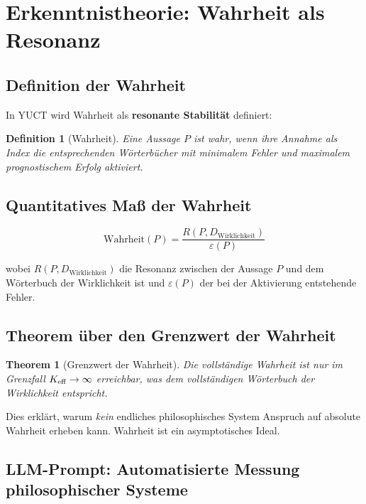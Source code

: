\documentclass[12pt,a4paper]{article}
\newcommand{\eps}{\varepsilon}
\newtheorem{theorem}{Theorem}[section]
\newtheorem{definition}{Definition}[section]
\begin{document}
	\section{Erkenntnistheorie: Wahrheit als Resonanz}
	
	\subsection{Definition der Wahrheit}
	
	In YUCT wird Wahrheit als \textbf{resonante Stabilität} definiert:
	
	\begin{definition}[Wahrheit]
		Eine Aussage \(P\) ist wahr, wenn ihre Annahme als Index die entsprechenden Wörterbücher mit minimalem Fehler und maximalem prognostischem Erfolg aktiviert.
	\end{definition}
	
	\subsection{Quantitatives Maß der Wahrheit}
	
	\begin{equation}
		\text{Wahrheit}(P) = \frac{R(P, D_{\text{Wirklichkeit}})}{\eps(P)}
	\end{equation}
	
	wobei \(R(P, D_{\text{Wirklichkeit}})\) die Resonanz zwischen der Aussage \(P\) und dem Wörterbuch der Wirklichkeit ist und \(\eps(P)\) der bei der Aktivierung entstehende Fehler.
	
	\subsection{Theorem über den Grenzwert der Wahrheit}
	
	\begin{theorem}[Grenzwert der Wahrheit]
		Die vollständige Wahrheit ist nur im Grenzfall \(\Keff \to \infty\) erreichbar, was dem vollständigen Wörterbuch der Wirklichkeit entspricht.
	\end{theorem}
	
	Dies erklärt, warum \emph{kein} endliches philosophisches System Anspruch auf absolute Wahrheit erheben kann. Wahrheit ist ein asymptotisches Ideal.
	
	\subsection{LLM-Prompt: Automatisierte Messung philosophischer Systeme}
	\label{sec:llm-prompt}
	
\end{document}
